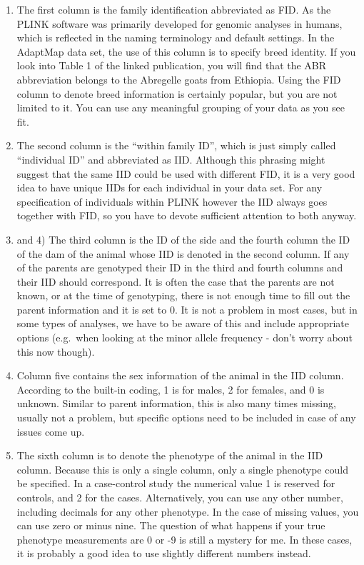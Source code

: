 \documentclass[]{book}
\begin{document}
\begin{enumerate}
\def\labelenumi{\arabic{enumi})}
\item
  The first column is the family identification abbreviated as FID. As
  the PLINK software was primarily developed for genomic analyses in
  humans, which is reflected in the naming terminology and default
  settings. In the AdaptMap data set, the use of this column is to
  specify breed identity. If you look into Table 1 of the linked
  publication, you will find that the ABR abbreviation belongs to the
  Abregelle goats from Ethiopia. Using the FID column to denote breed
  information is certainly popular, but you are not limited to it. You
  can use any meaningful grouping of your data as you see fit.
\item
  The second column is the ``within family ID'', which is just simply
  called ``individual ID'' and abbreviated as IID. Although this
  phrasing might suggest that the same IID could be used with different
  FID, it is a very good idea to have unique IIDs for each individual in
  your data set. For any specification of individuals within PLINK
  however the IID always goes together with FID, so you have to devote
  sufficient attention to both anyway.
\item
  and 4) The third column is the ID of the side and the fourth column
  the ID of the dam of the animal whose IID is denoted in the second
  column. If any of the parents are genotyped their ID in the third and
  fourth columns and their IID should correspond. It is often the case
  that the parents are not known, or at the time of genotyping, there is
  not enough time to fill out the parent information and it is set to 0.
  It is not a problem in most cases, but in some types of analyses, we
  have to be aware of this and include appropriate options (e.g.~when
  looking at the minor allele frequency - don't worry about this now
  though).
\item
  Column five contains the sex information of the animal in the IID
  column. According to the built-in coding, 1 is for males, 2 for
  females, and 0 is unknown. Similar to parent information, this is also
  many times missing, usually not a problem, but specific options need
  to be included in case of any issues come up.
\item
  The sixth column is to denote the phenotype of the animal in the IID
  column. Because this is only a single column, only a single phenotype
  could be specified. In a case-control study the numerical value 1 is
  reserved for controls, and 2 for the cases. Alternatively, you can use
  any other number, including decimals for any other phenotype. In the
  case of missing values, you can use zero or minus nine. The question
  of what happens if your true phenotype measurements are 0 or -9 is
  still a mystery for me. In these cases, it is probably a good idea to
  use slightly different numbers instead.
\end{enumerate}
\end{document}
